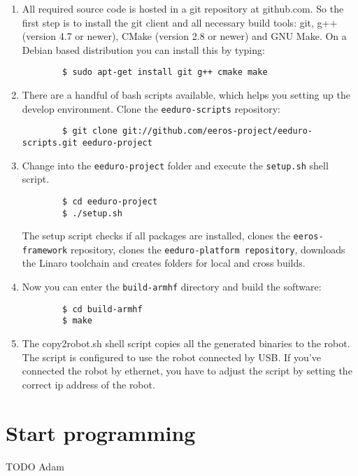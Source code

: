 \begin{enumerate}
	\item All required source code is hosted in a git repository at github.com. So the first step is to install the git client and all necessary build tools: git, g++ (version 4.7 or newer), CMake (version 2.8 or newer) and GNU Make. On a Debian based distribution you can install this by typing:
		\begin{verbatim}
		$ sudo apt-get install git g++ cmake make
		\end{verbatim}
	\item There are a handful of bash scripts available, which helps you setting up the develop environment. Clone the \texttt{eeduro-scripts} repository:
		\begin{verbatim}
		$ git clone git://github.com/eeros-project/eeduro-scripts.git eeduro-project
		\end{verbatim}
	\item Change into the \texttt{eeduro-project} folder and execute the \texttt{setup.sh} shell script.
		\begin{verbatim}
		$ cd eeduro-project
		$ ./setup.sh
		\end{verbatim}
		The setup script checks if all packages are installed, clones the \texttt{eeros-framework} repository, clones the \texttt{eeduro-platform repository}, downloads the Linaro toolchain and creates folders for local and cross builds.
	\item Now you can enter the \texttt{build-armhf} directory and build the software:
		\begin{verbatim}
		$ cd build-armhf
		$ make
		\end{verbatim}
	\item The copy2robot.sh shell script copies all the generated binaries to the robot. The script is configured to use the robot connected by USB. If you've connected the robot by ethernet, you have to adjust the script by setting the correct ip address of the robot.
\end{enumerate}


\chapter{Start programming}
TODO Adam


